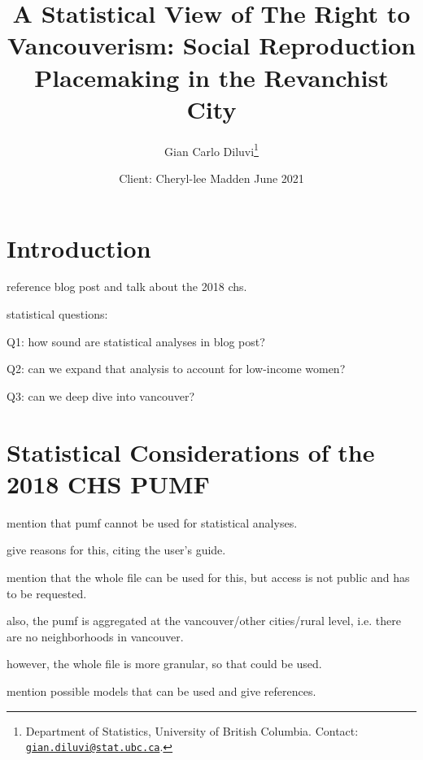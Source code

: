 \documentclass[11pt]{article}
\title{\vspace{-2cm}\Large A Statistical View of The Right to Vancouverism: Social Reproduction Placemaking in the Revanchist City}
\author{\normalsize Gian Carlo Diluvi\footnote{Department of Statistics, University of British Columbia. Contact: \href{mailto:gian.diluvi@stat.ubc.ca}{\texttt{gian.diluvi@stat.ubc.ca}}.}}
\date{\normalsize Client: Cheryl-lee Madden
\vskip 0.1cm
June 2021}
\begin{document}
\maketitle





\section{Introduction}

reference blog post and talk about the 2018 chs.

statistical questions:

Q1: how sound are statistical analyses in blog post?

Q2: can we expand that analysis to account for low-income women?

Q3: can we deep dive into vancouver?







\section{Statistical Considerations of the 2018 CHS PUMF} \label{sec:stats}

mention that pumf cannot be used for statistical analyses.

give reasons for this, citing the user's guide.

mention that the whole file can be used for this, but access is not public and has to be requested.

also, the pumf is aggregated at the vancouver/other cities/rural level, i.e. there are no neighborhoods in vancouver.

however, the whole file is more granular, so that could be used.

mention possible models that can be used and give references.
\end{document}
